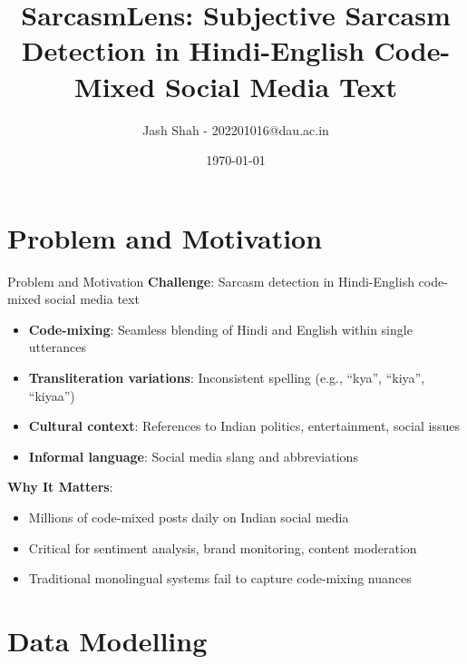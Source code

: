 \documentclass[aspectratio=169,xcolor=dvipsnames]{beamer}
\title{SarcasmLens: Subjective Sarcasm Detection in Hindi-English Code-Mixed Social Media Text}
\author{Jash Shah - 202201016@dau.ac.in}
\institute
{
    Dhirubhai Ambani University
}
\date{\today}
\begin{document}
\begin{frame}
    \titlepage
\end{frame}


\section{Problem and Motivation}

\begin{frame}{Problem and Motivation}
    \textbf{Challenge}: Sarcasm detection in Hindi-English code-mixed social media text
    
    \begin{itemize}
        \item \textbf{Code-mixing}: Seamless blending of Hindi and English within single utterances
        \item \textbf{Transliteration variations}: Inconsistent spelling (e.g., ``kya'', ``kiya'', ``kiyaa'')
        \item \textbf{Cultural context}: References to Indian politics, entertainment, social issues
        \item \textbf{Informal language}: Social media slang and abbreviations
    \end{itemize}
    
    \vspace{0.3cm}
    
    \textbf{Why It Matters}:
    \begin{itemize}
        \item Millions of code-mixed posts daily on Indian social media
        \item Critical for sentiment analysis, brand monitoring, content moderation
        \item Traditional monolingual systems fail to capture code-mixing nuances
    \end{itemize}
\end{frame}


\section{Data Modelling}
\end{document}
